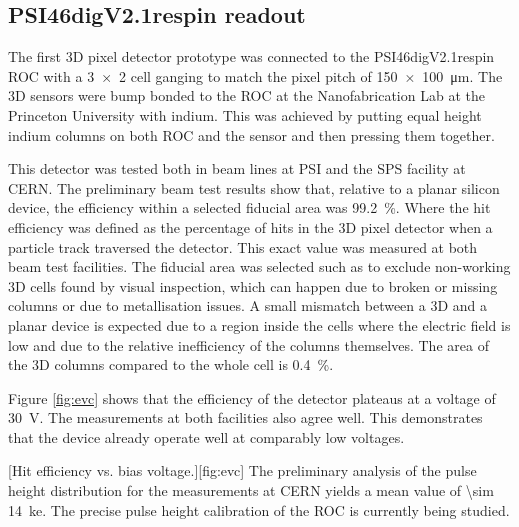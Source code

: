 \subsection{PSI46digV2.1respin readout}
The first 3D pixel detector prototype was connected to the PSI46digV2.1respin \ac{ROC} \cite{kornmayer} with a \SI{3x2}{} cell ganging to match the pixel pitch of \SI{150x100}{\micro\meter}. The 3D sensors were bump bonded to the \ac{ROC} at the Nanofabrication Lab at the Princeton University with indium. This was achieved by putting equal height indium columns on both \ac{ROC} and the sensor and then pressing them together.\par
This detector was tested both in beam lines at \ac{PSI} and the SPS facility at CERN. The preliminary beam test results show that, relative to a planar silicon device, the efficiency within a selected fiducial area was \SI{99.2}{\%}. Where the hit efficiency was defined as the percentage of hits in the 3D pixel detector when a particle track traversed the detector. This exact value was measured at both beam test facilities. The fiducial area was selected such as to exclude non-working 3D cells found by visual inspection, which can happen due to broken or missing columns or due to metallisation issues. A small mismatch between a 3D and a planar device is expected due to a region inside the cells where the electric field is low \cite{guilio} and due to the relative inefficiency of the columns themselves. The area of the 3D columns compared to the whole cell is \SI{.4}{\%}. \par 
Figure \vref{fig:evc} shows that the efficiency of the detector plateaus at a voltage of \SI{30}{\volt}. The measurements at both facilities also agree well. This demonstrates that the device already operate well at comparably low voltages.\par 
{}[Hit efficiency vs. bias voltage.][fig:evc]
The preliminary analysis of the pulse height distribution for the measurements at CERN yields a mean value of \SI{\sim 14}{\kilo e}. The precise pulse height calibration of the \ac{ROC} is currently being studied.